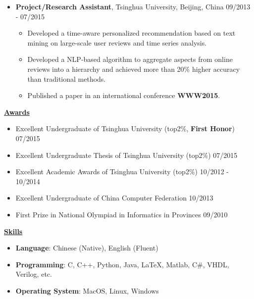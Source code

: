 \documentclass[11pt]{article}
\begin{document}
\begin{CJK}{GBK}{kai}
\begin{itemize}
   \item \textbf{Project/Research Assistant}, Tsinghua University, Beijing, China \hfill 09/2013 - 07/2015\\
     \begin{itemize}
     \item Developed a time-aware personalized recommendation based on text mining on large-scale user reviews and time series analysis. 
     \item Developed a NLP-based algorithm to aggregate aspects from online reviews into a hierarchy and achieved more than 20\% higher accuracy than traditional methods.
     \item Published a paper in an international conference \textbf{WWW2015}.
     \end{itemize}
\end{itemize}


\bigskip

{ \textbf{\underline{Awards}}}\\
\begin{itemize}
\item Excellent Undergraduate of Tsinghua University (top2\%, \textbf{First Honor}) \hfill 07/2015
\item Excellent Undergraduate Thesis of Tsinghua University (top2\%) \hfill 07/2015
\item Excellent Academic Awards of Tsinghua University (top2\%) \hfill 10/2012 - 10/2014
\item Excellent Undergraduate of China Computer Federation \hfill 10/2013
\item First Prize in National Olympiad in Informatics in Provinces \hfill 09/2010
\end{itemize}

\bigskip

{ \textbf{\underline{Skills}}}
\begin{itemize}
    \item \textbf{Language}: Chinese (Native), English (Fluent)\\\smallskip
    \item \textbf{Programming}: C, C++, Python, Java, {\LaTeX},  Matlab, C\#, VHDL, Verilog, etc.\\\smallskip
    \item \textbf{Operating System}: MacOS, Linux, Windows
\end{itemize}

\end{CJK}
\end{document}
